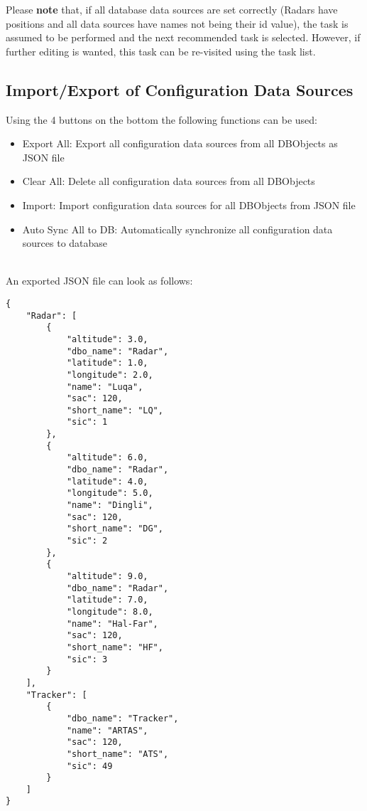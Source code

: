 Please \textbf{note} that, if all database data sources are set correctly (Radars have positions and all data sources have names not being their id value), the task is assumed to be performed and the next recommended task is selected. However, if further editing is wanted, this task can be re-visited using the task list.

\subsection{Import/Export of Configuration Data Sources}
\label{sec:config_ds_export}

Using the 4 buttons on the bottom the following functions can be used:

\begin{itemize}  
\item Export All: Export all configuration data sources from all DBObjects as JSON file
\item Clear All: Delete all configuration data sources from all DBObjects
\item Import: Import configuration data sources for all DBObjects from JSON file
\item Auto Sync All to DB: Automatically synchronize all configuration data sources to database
\end{itemize}
\ \\

An exported JSON file can look as follows:

\begin{lstlisting}
{
    "Radar": [
        {
            "altitude": 3.0,
            "dbo_name": "Radar",
            "latitude": 1.0,
            "longitude": 2.0,
            "name": "Luqa",
            "sac": 120,
            "short_name": "LQ",
            "sic": 1
        },
        {
            "altitude": 6.0,
            "dbo_name": "Radar",
            "latitude": 4.0,
            "longitude": 5.0,
            "name": "Dingli",
            "sac": 120,
            "short_name": "DG",
            "sic": 2
        },
        {
            "altitude": 9.0,
            "dbo_name": "Radar",
            "latitude": 7.0,
            "longitude": 8.0,
            "name": "Hal-Far",
            "sac": 120,
            "short_name": "HF",
            "sic": 3
        }
    ],
    "Tracker": [
        {
            "dbo_name": "Tracker",
            "name": "ARTAS",
            "sac": 120,
            "short_name": "ATS",
            "sic": 49
        }
    ]
}
\end{lstlisting}

